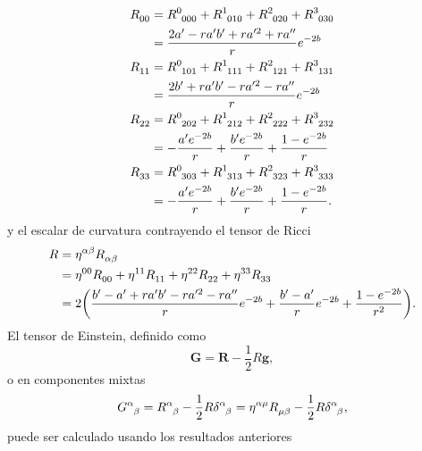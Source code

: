 \begin{subequations}
\begin{align}
    \tensor{R}{_0_0}&=\tensor{R}{^0_0_0_0} + \tensor{R}{^1_0_1_0} + \tensor{R}{^2_0_2_0} + \tensor{R}{^3_0_3_0} \nonumber \\
    &= \frac{2a^\prime-r a^\prime b^\prime +r a^{\prime 2}+r a^{\prime\prime}}{r}e^{-2b} \\
    \tensor{R}{_1_1}&=\tensor{R}{^0_1_0_1} + \tensor{R}{^1_1_1_1} + \tensor{R}{^2_1_2_1} + \tensor{R}{^3_1_3_1} \nonumber \\
    &=\frac{2b^\prime+r a^\prime b^\prime -r a^{\prime 2}-r a^{\prime\prime}}{r}e^{-2b} \\
    \tensor{R}{_2_2}&=\tensor{R}{^0_2_0_2} + \tensor{R}{^1_2_1_2} + \tensor{R}{^2_2_2_2} + \tensor{R}{^3_2_3_2} \nonumber \\
    &= -\frac{a^\prime e^{-2b}}{r}+\frac{b^\prime e^{-2b}}{r}+\frac{1-e^{-2b}}{r} \\
    \tensor{R}{_3_3}&=\tensor{R}{^0_3_0_3} + \tensor{R}{^1_3_1_3} + \tensor{R}{^2_3_2_3} + \tensor{R}{^3_3_3_3} \nonumber \\
    &= -\frac{a^\prime e^{-2b}}{r}+\frac{b^\prime e^{-2b}}{r}+\frac{1-e^{-2b}}{r}.
\end{align}
\end{subequations}
y el escalar de curvatura contrayendo el tensor de Ricci
\begin{align}
    R&=\tensor{\eta}{^\alpha^\beta} \tensor{R}{_\alpha_\beta} \nonumber \\
    &= \tensor{\eta}{^0^0} \tensor{R}{_0_0} + \tensor{\eta}{^1^1} \tensor{R}{_1_1} + \tensor{\eta}{^2^2} \tensor{R}{_2_2} + \tensor{\eta}{^3^3} \tensor{R}{_3_3} \nonumber \\
    &= 2\qty(\frac{b^\prime-a^\prime+r a^\prime b^\prime -r a^{\prime 2}-r a^{\prime\prime}}{r}e^{-2b}+\frac{b^\prime-a^\prime}{r}e^{-2b}+\frac{1-e^{-2b}}{r^2}).
\end{align}
El tensor de Einstein, definido como
\begin{equation}
    \bm{G}=\bm{R}-\frac{1}{2}R\bm{g},
\end{equation}
o en componentes mixtas
\begin{equation}
    \tensor{G}{^\alpha_\beta}=\tensor{R}{^\alpha_\beta}-\frac{1}{2}R\tensor{\delta}{^\alpha_\beta}=\tensor{\eta}{^\alpha^\mu}\tensor{R}{_\mu_\beta}-\frac{1}{2}R\tensor{\delta}{^\alpha_\beta},
\end{equation}
puede ser calculado usando los resultados anteriores
\begingroup
\allowdisplaybreaks
